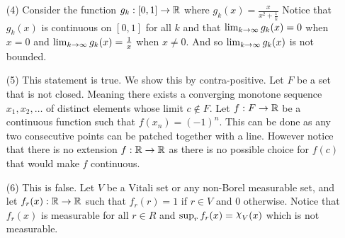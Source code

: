 \documentclass[12pt]{amsart}
\DeclareRobustCommand{\rchi}{{\mathpalette\irchi\relax}}
\newcommand{\irchi}[2]{\raisebox{\depth}{$#1\chi$}} %
\begin{document}
\begin{itemize}
   \item[(4)] Consider the function $g_k:[0,1]\rightarrow \mathbb{R}$ where $g_k(x)=\frac{x}{x^2+\frac{1}{k}}$
               Notice that $g_k(x)$ is continuous on $[0,1]$ for all $k$ and that
               $\lim_{k\rightarrow \infty}g_k(x)=0$ when $x=0$ and 
               $\lim_{k\rightarrow \infty}g_k(x)=\frac{1}{x}$ when $x\neq 0$. And so $\lim_{k\rightarrow \infty}g_k(x)$ is not bounded.


   
   \item[(5)] This statement is true. We show this by contra-positive. Let $F$ be a set that 
   is not closed. Meaning there exists a converging monotone sequence $x_1,x_2,\dots$ of distinct 
   elements whose limit $c\not\in F$. Let $f:F\rightarrow \mathbb{R}$ be a continuous function such that $f(x_n)=(-1)^n$. 
   This can be done as any two consecutive points can be patched together with a line. However notice 
   that there is no extension $f:\mathbb{R}\rightarrow\mathbb{R}$ as there is no possible choice for $f(c)$ that would make $f$ continuous.


   \item[(6)] This is false. Let $V$ be a Vitali set or any non-Borel measurable set, and 
   let $f_r(x):\mathbb{R}\rightarrow\mathbb{R}$ such that $f_r(r)=1$ if $r\in V$ and $0$ otherwise. Notice that 
   $f_r(x)$ is measurable for all $r\in R$ and 
   $\sup_{r}f_r(x)=\rchi_{V}(x)$ which is not measurable.
\end{itemize}
\end{document}
